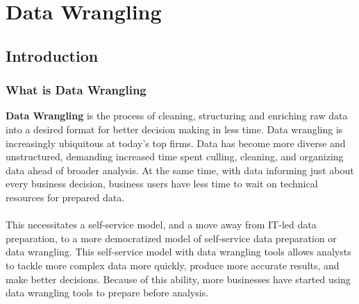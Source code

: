 \documentclass[10pt,a4paper]{article}
\newcommand{\nline}{\\~\\}
\begin{document}
 \pagebreak


\section{Data Wrangling} 
 
 \subsection{Introduction}
 \subsubsection{What is Data Wrangling}
\textbf{Data Wrangling} is the process of cleaning, structuring and enriching raw data into a desired format for better decision making in less time. Data wrangling is increasingly ubiquitous at today’s top firms. Data has become more diverse and unstructured, demanding increased time spent culling, cleaning, and organizing data ahead of broader analysis. At the same time, with data informing just about every business decision, business users have less time to wait on technical resources for prepared data.
\nline
This necessitates a self-service model, and a move away from IT-led data preparation, to a more democratized model of self-service data preparation or data wrangling. This self-service model with data wrangling tools allows analysts to tackle more complex data more quickly, produce more accurate results, and make better decisions. Because of this ability, more businesses have started using data wrangling tools to prepare before analysis.
\end{document}
